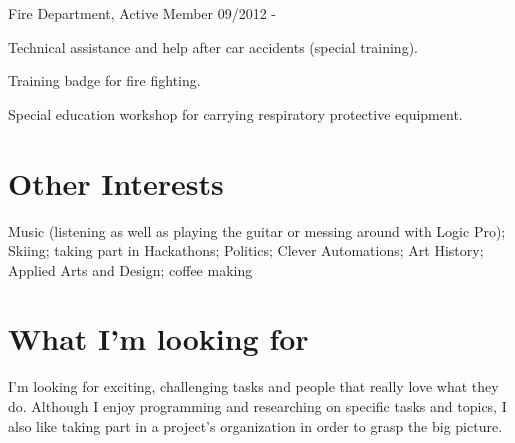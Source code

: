 \documentclass{article}
\renewenvironment{itemize}[1]{\begin{compactitem}#1}{\end{compactitem}}
\begin{document}
\ralewaysb Fire Department, \raleway Active Member \hfill 09/2012 - 
\begin{itemize}[-]
  \item Technical assistance and help after car accidents (special training).
  \item Training badge for fire fighting.
  \item Special education workshop for carrying respiratory protective equipment.
\end{itemize}


\vspace{.9em}
\section{Other Interests}
Music (listening as well as playing the guitar or messing around with Logic Pro); Skiing; taking part in Hackathons; Politics; Clever Automations; Art History; Applied Arts and Design; coffee making

\vspace{.9em}
\section{What I'm looking for}
I'm looking for exciting, challenging tasks and people that really love what they do. Although I enjoy programming and researching on specific tasks and topics, I also like taking part in a project's organization in order to grasp the big picture. 
\end{document}
